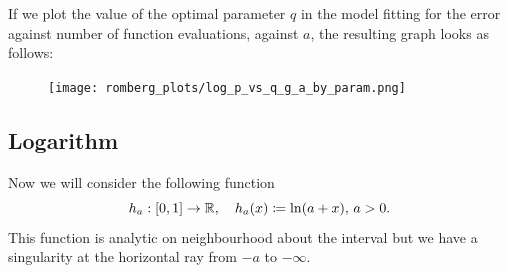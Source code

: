 If we plot the value of the optimal parameter \(q\) in the model fitting for the error against number of function evaluations, against \(a\), the resulting graph looks as follows: 

\begin{figure}[H]
\centering
\begin{minipage}{0.45\textwidth}
\centering
\texttt{[image: romberg\_plots/log\_p\_vs\_q\_g\_a\_by\_param.png]}
\end{minipage}
\end{figure}

\subsection{Logarithm}

Now we will consider the following function 
\[
h_a: [0, 1] \rightarrow \mathbb{R}, \quad h_a(x) \coloneqq \ln(a + x),\, a > 0.
\]
This function is analytic on neighbourhood about the interval but we have a singularity at the horizontal ray from \(-a\) to \(-\infty\).

